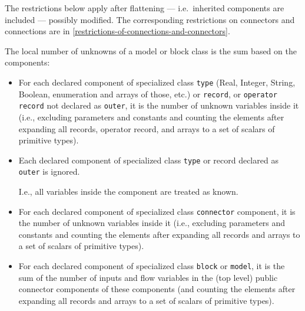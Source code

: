 The restrictions below apply after flattening --- i.e.\ inherited components are included --- possibly modified.  The corresponding restrictions on connectors and connections are in
\cref{restrictions-of-connections-and-connectors}.

\begin{definition}
The local number of unknowns of a model or block class is the sum based on the components:
\begin{itemize}
\item
  For each declared component of specialized class \lstinline!type! (Real, Integer,
  String, Boolean, enumeration and arrays of those, etc.) or \lstinline!record!, or
  \lstinline!operator record! not declared as \lstinline!outer!, it is the number of unknown
  variables inside it (i.e., excluding parameters and constants and
  counting the elements after expanding all records, operator record,
  and arrays to a set of scalars of primitive types).
\item
  Each declared component of specialized class \lstinline!type! or record declared
  as \lstinline!outer! is ignored.
  \begin{nonnormative}
  I.e., all variables inside the component are treated as known.
  \end{nonnormative}
\item
  For each declared component of specialized class \lstinline!connector! component,
  it is the number of unknown variables inside it (i.e., excluding
  parameters and constants and counting the elements after expanding all
  records and arrays to a set of scalars of primitive types).
\item
  For each declared component of specialized class \lstinline!block! or \lstinline!model!, it is
  the sum of the number of inputs and flow variables in the (top
  level) public connector components of these components (and counting
  the elements after expanding all records and arrays to a set of
  scalars of primitive types).
\end{itemize}
\end{definition}


